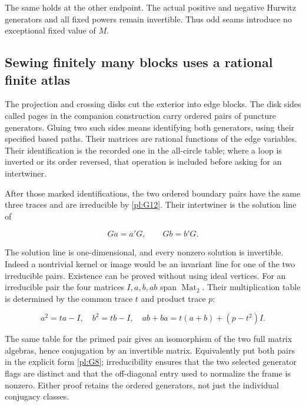 The same holds at the other endpoint. The actual positive and
negative Hurwitz generators and all fixed powers remain
invertible. Thus odd seams introduce no exceptional fixed
value of \(M\).

\subsection{Sewing finitely many blocks uses a rational finite atlas}\label{pl:sewing-finitely-many-blocks-uses-a-rational-finite-atlas}

The projection and crossing disks cut the exterior into edge blocks.
The disk sides called pages in the companion construction carry
ordered pairs of puncture generators. Gluing two such sides means
identifying both generators, using their specified based paths.
Their matrices are rational functions of the edge variables.
Their identification is the recorded one in the all-circle table;
where a loop is inverted or its order reversed, that operation
is included before asking for an intertwiner.

After those marked identifications, the two ordered boundary
pairs have the same three traces and are irreducible by \eqref{pl:G12}.
Their intertwiner is the solution line of

\begin{equation}\label{pl:G14}
G a=a'G,\qquad G b=b'G.
\end{equation}

The solution line is one-dimensional, and every nonzero solution
is invertible. Indeed a nontrivial kernel or image would be an
invariant line for one of the two irreducible pairs. Existence
can be proved without using ideal vertices. For an irreducible
pair the four matrices \(I,a,b,ab\) span
\(\operatorname{Mat}_2\). Their multiplication table is
determined by the common trace \(t\) and product trace \(p\):

\begin{equation}\label{pl:G14a}
a^2=ta-I,\quad b^2=tb-I,\quad
 ab+ba=t(a+b)+(p-t^2)I.
\end{equation}

The same table for the primed pair gives an isomorphism of
the two full matrix algebras, hence conjugation by an
invertible matrix. Equivalently put both pairs in the
explicit form \eqref{pl:G8}; irreducibility ensures that the two
selected generator flags are distinct and that the
off-diagonal entry used to normalize the frame is nonzero.
Either proof retains the ordered generators, not just the
individual conjugacy classes.

